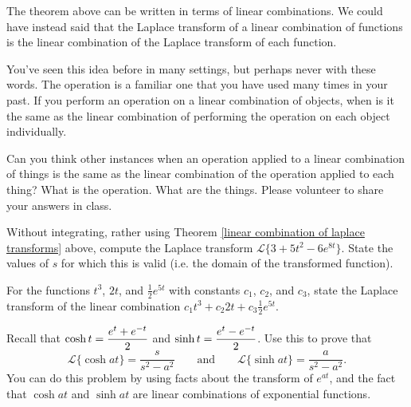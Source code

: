 \begin{problem*}
The theorem above can be written in terms of linear combinations. We could have instead said that the Laplace transform of a linear combination of functions is the linear combination of the Laplace transform of each function. 

You've seen this idea before in many settings, but perhaps never with these words. The operation is a familiar one that you have used many times in your past.  If you perform an operation on a linear combination of objects, when is it the same as the linear combination of performing the operation on each object individually. 

Can you think other instances when an operation applied to a linear combination of things is the same as the linear combination of the operation applied to each thing? What is the operation.  What are the things. Please volunteer to share your answers in class.  
\end{problem*}

\begin{problem}\label{laplace transform of linear combination practice}
Without integrating, rather using Theorem \ref{linear combination of laplace transforms} above, compute the Laplace transform $\mathscr{L}\{3+5t^2-6e^{8t}\}$.  State the values of $s$ for which this is valid (i.e. the domain of the transformed function). 

For the functions $t^3$, $2t$, and $\frac{1}{2}e^{5t}$ with constants $c_1$, $c_2$, and $c_3$, state the Laplace transform of the linear combination $c_1t^3+c_2 2t+c_3\frac{1}{2}e^{5t}$.
\end{problem}


\begin{problem}\label{laplace transform of cosh and sinh}
Recall that $\displaystyle\cosh t = \frac{e^t+e^{-t}}{2}$ and $\displaystyle\sinh t = \frac{e^t-e^{-t}}{2}$. 
Use this to prove that $$\mathscr{L}\{\cosh a t\} = \frac{s}{s^2-a^2}\quad \quad \text{and}\quad\quad\mathscr{L}\{\sinh a t\} = \frac{a}{s^2-a^2}.$$ You can do this problem by using facts about the transform of $e^{at}$, and the fact that $\cosh at$ and $\sinh at$ are linear combinations of exponential functions. 
\end{problem}

\subsection*{\ideaA}

